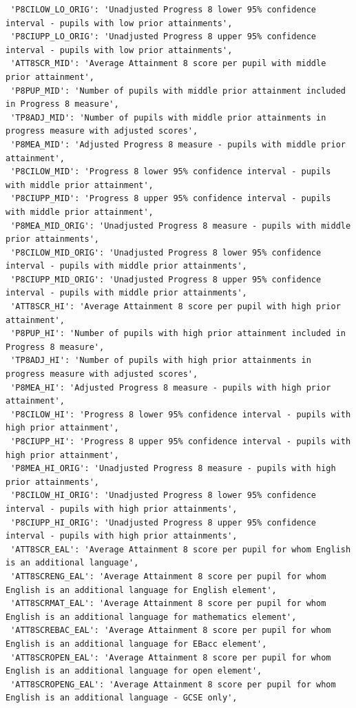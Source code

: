 \documentclass[
  letterpaper,
  DIV=11,
  numbers=noendperiod]{scrartcl}
\begin{document}
\begin{verbatim}
 'P8CILOW_LO_ORIG': 'Unadjusted Progress 8 lower 95% confidence interval - pupils with low prior attainments',
 'P8CIUPP_LO_ORIG': 'Unadjusted Progress 8 upper 95% confidence interval - pupils with low prior attainments',
 'ATT8SCR_MID': 'Average Attainment 8 score per pupil with middle prior attainment',
 'P8PUP_MID': 'Number of pupils with middle prior attainment included in Progress 8 measure',
 'TP8ADJ_MID': 'Number of pupils with middle prior attainments in progress measure with adjusted scores',
 'P8MEA_MID': 'Adjusted Progress 8 measure - pupils with middle prior attainment',
 'P8CILOW_MID': 'Progress 8 lower 95% confidence interval - pupils with middle prior attainment',
 'P8CIUPP_MID': 'Progress 8 upper 95% confidence interval - pupils with middle prior attainment',
 'P8MEA_MID_ORIG': 'Unadjusted Progress 8 measure - pupils with middle prior attainments',
 'P8CILOW_MID_ORIG': 'Unadjusted Progress 8 lower 95% confidence interval - pupils with middle prior attainments',
 'P8CIUPP_MID_ORIG': 'Unadjusted Progress 8 upper 95% confidence interval - pupils with middle prior attainments',
 'ATT8SCR_HI': 'Average Attainment 8 score per pupil with high prior attainment',
 'P8PUP_HI': 'Number of pupils with high prior attainment included in Progress 8 measure',
 'TP8ADJ_HI': 'Number of pupils with high prior attainments in progress measure with adjusted scores',
 'P8MEA_HI': 'Adjusted Progress 8 measure - pupils with high prior attainment',
 'P8CILOW_HI': 'Progress 8 lower 95% confidence interval - pupils with high prior attainment',
 'P8CIUPP_HI': 'Progress 8 upper 95% confidence interval - pupils with high prior attainment',
 'P8MEA_HI_ORIG': 'Unadjusted Progress 8 measure - pupils with high prior attainments',
 'P8CILOW_HI_ORIG': 'Unadjusted Progress 8 lower 95% confidence interval - pupils with high prior attainments',
 'P8CIUPP_HI_ORIG': 'Unadjusted Progress 8 upper 95% confidence interval - pupils with high prior attainments',
 'ATT8SCR_EAL': 'Average Attainment 8 score per pupil for whom English is an additional language',
 'ATT8SCRENG_EAL': 'Average Attainment 8 score per pupil for whom English is an additional language for English element',
 'ATT8SCRMAT_EAL': 'Average Attainment 8 score per pupil for whom English is an additional language for mathematics element',
 'ATT8SCREBAC_EAL': 'Average Attainment 8 score per pupil for whom English is an additional language for EBacc element',
 'ATT8SCROPEN_EAL': 'Average Attainment 8 score per pupil for whom English is an additional language for open element',
 'ATT8SCROPENG_EAL': 'Average Attainment 8 score per pupil for whom English is an additional language - GCSE only',

\end{verbatim}
\end{document}
